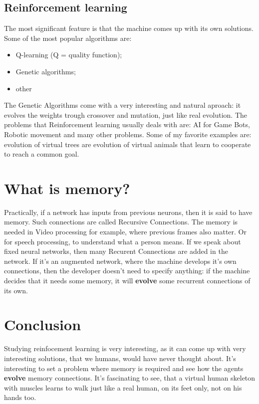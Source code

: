 \documentclass{article}
\begin{document}
		\subsection{Reinforcement learning}
			The most significant feature is that the machine comes up with its own solutions.
			Some of the most popular algorithms are:
			\begin{itemize}
				\item Q-learning (Q = quality function);
				\item Genetic algorithms;
				\item other
			\end{itemize}
			The Genetic Algorithms come with a very interesting and natural aproach: it evolves the weights trough crossover and mutation, just like real evolution.
			The problems that Reinforcement learning usually deals with are: AI for Game Bots, Robotic movement and many other problems. Some of my favorite examples are: evolution of virtual trees are evolution of virtual animals that learn to cooperate to reach a common goal.
			
	\section{What is memory?}
		Practically, if a network has inputs from previous neurons, then it is said to have memory. Such connections are called Recursive Connections. The memory is needed in Video processing for example, where previous frames also matter. Or for speech processing, to understand what a person means. If we speak about fixed neural networks, then many Recurent Connections are added in the network. If it's an augmented network, where the machine develops it's own connections, then the developer doesn't need to specify anything: if the machine decides that it needs some memory, it will \textbf{evolve} some recurrent connections of its own.

	\section{Conclusion}
		Studying reinfocement learning is very interesting, as it can come up with very interesting solutions, that we humans, would have never thought about. It's interesting to set a problem where memory is required and see how the agents \textbf{evolve} memory connections. It's fascinating to see, that a virtual human skeleton with muscles learns to walk just like a real human, on its feet only, not on his hands too.
\end{document}
